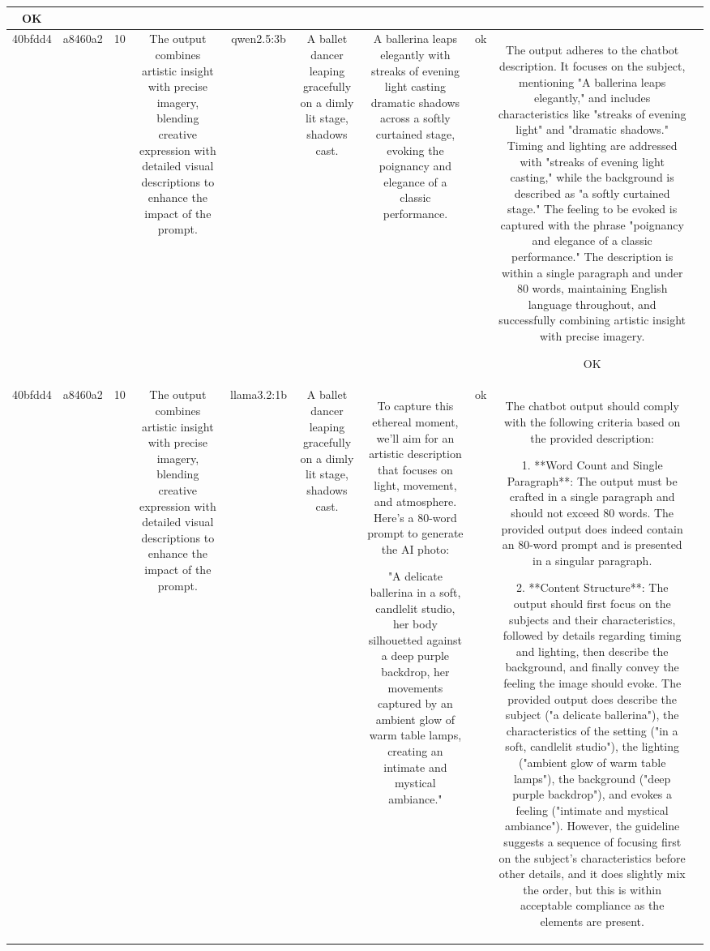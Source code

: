 \begin{table}[h!]
\begin{tabular}{|c|c|c|c|c|c|c|c|c|c|}
OK & \\
\hline
40bfdd4 & a8460a2 & 10 & The output combines artistic insight with precise imagery, blending creative expression with detailed visual descriptions to enhance the impact of the prompt. & qwen2.5:3b & A ballet dancer leaping gracefully on a dimly lit stage, shadows cast. & A ballerina leaps elegantly with streaks of evening light casting dramatic shadows across a softly curtained stage, evoking the poignancy and elegance of a classic performance. & ok & The output adheres to the chatbot description. It focuses on the subject, mentioning "A ballerina leaps elegantly," and includes characteristics like "streaks of evening light" and "dramatic shadows." Timing and lighting are addressed with "streaks of evening light casting," while the background is described as "a softly curtained stage." The feeling to be evoked is captured with the phrase "poignancy and elegance of a classic performance." The description is within a single paragraph and under 80 words, maintaining English language throughout, and successfully combining artistic insight with precise imagery.

OK & \\
\hline
40bfdd4 & a8460a2 & 10 & The output combines artistic insight with precise imagery, blending creative expression with detailed visual descriptions to enhance the impact of the prompt. & llama3.2:1b & A ballet dancer leaping gracefully on a dimly lit stage, shadows cast. & To capture this ethereal moment, we'll aim for an artistic description that focuses on light, movement, and atmosphere. Here's a 80-word prompt to generate the AI photo: 

"A delicate ballerina in a soft, candlelit studio, her body silhouetted against a deep purple backdrop, her movements captured by an ambient glow of warm table lamps, creating an intimate and mystical ambiance." & ok & The chatbot output should comply with the following criteria based on the provided description:

1. **Word Count and Single Paragraph**: The output must be crafted in a single paragraph and should not exceed 80 words. The provided output does indeed contain an 80-word prompt and is presented in a singular paragraph.

2. **Content Structure**: The output should first focus on the subjects and their characteristics, followed by details regarding timing and lighting, then describe the background, and finally convey the feeling the image should evoke. The provided output does describe the subject ("a delicate ballerina"), the characteristics of the setting ("in a soft, candlelit studio"), the lighting ("ambient glow of warm table lamps"), the background ("deep purple backdrop"), and evokes a feeling ("intimate and mystical ambiance"). However, the guideline suggests a sequence of focusing first on the subject's characteristics before other details, and it does slightly mix the order, but this is within acceptable compliance as the elements are present.


\end{tabular}
\end{table}
